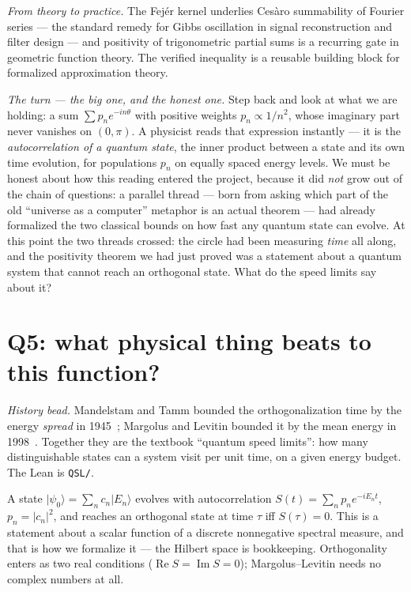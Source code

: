 \documentclass[11pt]{article}
\newcommand{\lean}[1]{\texttt{#1}}
\begin{document}
\emph{From theory to practice.} The Fej\'er kernel underlies Ces\`aro summability of
Fourier series --- the standard remedy for Gibbs oscillation in signal reconstruction and
filter design --- and positivity of trigonometric partial sums is a recurring gate in
geometric function theory. The verified inequality is a reusable building block for
formalized approximation theory.

\emph{The turn --- the big one, and the honest one.} Step back and look at what we are
holding: a sum $\sum p_n e^{-in\theta}$ with positive weights $p_n\propto 1/n^2$, whose
imaginary part never vanishes on $(0,\pi)$. A physicist reads that expression instantly
--- it is the \emph{autocorrelation of a quantum state}, the inner product between a
state and its own time evolution, for populations $p_n$ on equally spaced energy
levels. We must be honest about how this reading entered the project, because it did
\emph{not} grow out of the chain of questions: a parallel thread --- born from asking
which part of the old ``universe as a computer'' metaphor is an actual theorem --- had
already formalized the two classical bounds on how fast any quantum state can evolve.
At this point the two threads crossed: the circle had been measuring \emph{time} all
along, and the positivity theorem we had just proved was a statement about a quantum
system that cannot reach an orthogonal state. What do the speed limits say about it?

\section{Q5: what physical thing beats to this function?}\label{sec:clock}

\emph{History bead.} Mandelstam and Tamm bounded the orthogonalization time by the
energy \emph{spread} in 1945~\cite{mandelstam}; Margolus and Levitin bounded it by the
mean energy in 1998~\cite{margolus}. Together they are the textbook ``quantum speed
limits'': how many distinguishable states can a system visit per unit time, on a given
energy budget. The Lean is \lean{QSL/}.

A state $\lvert\psi_0\rangle=\sum_n c_n\lvert E_n\rangle$ evolves with autocorrelation
$S(t)=\sum_n p_n e^{-iE_nt}$, $p_n=\lvert c_n\rvert^2$, and reaches an orthogonal state
at time $\tau$ iff $S(\tau)=0$. This is a statement about a scalar function of a
discrete nonnegative spectral measure, and that is how we formalize it --- the Hilbert
space is bookkeeping. Orthogonality enters as two real conditions
($\operatorname{Re}S=\operatorname{Im}S=0$); Margolus--Levitin needs no complex numbers
at all.
\end{document}
